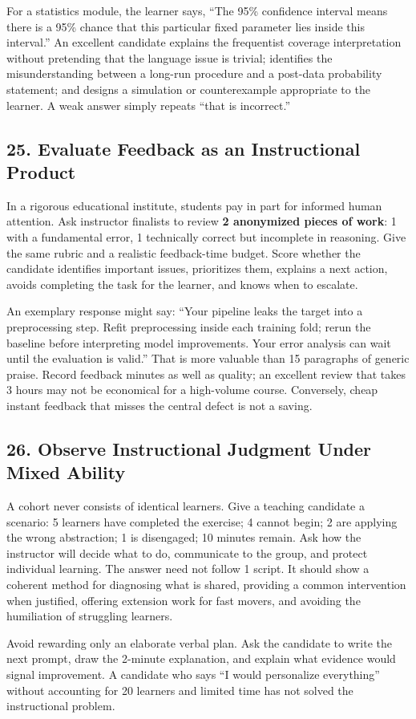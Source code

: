 For a statistics module, the learner says, ``The 95\% confidence interval means there is a 95\% chance that this particular fixed parameter lies inside this interval.'' An excellent candidate explains the frequentist coverage interpretation without pretending that the language issue is trivial; identifies the misunderstanding between a long-run procedure and a post-data probability statement; and designs a simulation or counterexample appropriate to the learner. A weak answer simply repeats ``that is incorrect.''

\subsection*{25. Evaluate Feedback as an Instructional Product}

In a rigorous educational institute, students pay in part for informed human attention. Ask instructor finalists to review \textbf{2 anonymized pieces of work}: 1 with a fundamental error, 1 technically correct but incomplete in reasoning. Give the same rubric and a realistic feedback-time budget. Score whether the candidate identifies important issues, prioritizes them, explains a next action, avoids completing the task for the learner, and knows when to escalate.

An exemplary response might say: ``Your pipeline leaks the target into a preprocessing step. Refit preprocessing inside each training fold; rerun the baseline before interpreting model improvements. Your error analysis can wait until the evaluation is valid.'' That is more valuable than 15 paragraphs of generic praise. Record feedback minutes as well as quality; an excellent review that takes 3 hours may not be economical for a high-volume course. Conversely, cheap instant feedback that misses the central defect is not a saving.

\subsection*{26. Observe Instructional Judgment Under Mixed Ability}

A cohort never consists of identical learners. Give a teaching candidate a scenario: 5 learners have completed the exercise; 4 cannot begin; 2 are applying the wrong abstraction; 1 is disengaged; 10 minutes remain. Ask how the instructor will decide what to do, communicate to the group, and protect individual learning. The answer need not follow 1 script. It should show a coherent method for diagnosing what is shared, providing a common intervention when justified, offering extension work for fast movers, and avoiding the humiliation of struggling learners.

Avoid rewarding only an elaborate verbal plan. Ask the candidate to write the next prompt, draw the 2-minute explanation, and explain what evidence would signal improvement. A candidate who says ``I would personalize everything'' without accounting for 20 learners and limited time has not solved the instructional problem.

